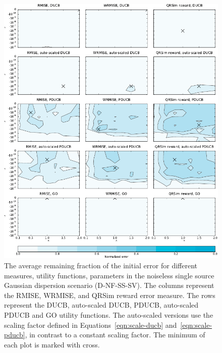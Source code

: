 \begin{figure}
    \centering
    \includegraphics{plots/psearch-D-NF-SS-SV}
    \caption[Remaining fraction of the initial error (D-NF-SS-SV)]{The average 
        remaining fraction of the initial error for different measures, utility 
        functions, parameters in the noiseless single source Gaussian dispersion 
        scenario (D-NF-SS-SV).  The columns represent the RMISE, WRMISE, and 
        QRSim reward error measure.  The rows represent the DUCB, auto-scaled 
        DUCB, PDUCB, auto-scaled PDUCB and GO utility functions. The auto-scaled 
        versions use the scaling factor defined in 
        Equations~\ref{eqn:scale-ducb} and~\ref{eqn:scale-pducb}, in contrast to 
        a constant scaling factor.  The minimum of each plot is marked with 
        cross.}\label{fig:psearch-D-NF-SS-SV}
\end{figure}

